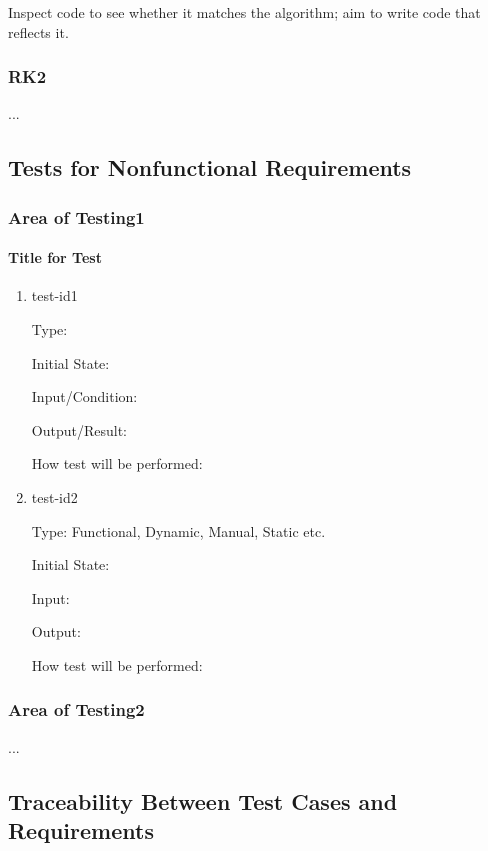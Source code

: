 \documentclass[12pt, titlepage]{article}
\begin{document}
Inspect code to see whether it matches the algorithm; aim to write code that 
reflects it.

\subsubsection{RK2}

...

\subsection{Tests for Nonfunctional Requirements}

\subsubsection{Area of Testing1}
		
\paragraph{Title for Test}

\begin{enumerate}

\item{test-id1\\}

Type: 
					
Initial State: 
					
Input/Condition: 
					
Output/Result: 
					
How test will be performed: 
					
\item{test-id2\\}

Type: Functional, Dynamic, Manual, Static etc.
					
Initial State: 
					
Input: 
					
Output: 
					
How test will be performed: 

\end{enumerate}

\subsubsection{Area of Testing2}

...

\subsection{Traceability Between Test Cases and Requirements}
\end{document}
